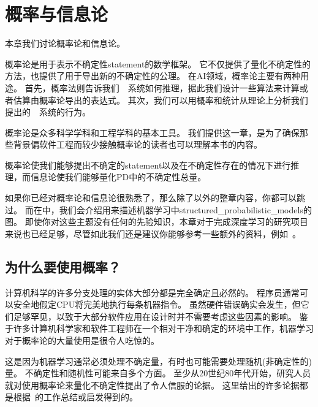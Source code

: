 \chapter{概率与信息论}
\label{chap:probability_and_information_theory}

本章我们讨论概率论和信息论。

概率论是用于表示不确定性\gls{statement}的数学框架。
它不仅提供了量化不确定性的方法，也提供了用于导出新的不确定性的公理。
在\gls{AI}领域，概率论主要有两种用途。
首先，概率法则告诉我们~~系统如何推理，据此我们设计一些算法来计算或者估算由概率论导出的表达式。
其次，我们可以用概率和统计从理论上分析我们提出的~~系统的行为。

概率论是众多科学学科和工程学科的基本工具。
我们提供这一章，是为了确保那些背景偏软件工程而较少接触概率论的读者也可以理解本书的内容。

概率论使我们能够提出不确定的\gls{statement}以及在不确定性存在的情况下进行推理，而信息论使我们能够量化\gls{PD}中的不确定性总量。

如果你已经对概率论和信息论很熟悉了，那么除了以外的整章内容，你都可以跳过。
而在中，我们会介绍用来描述机器学习中\gls{structured_probabilistic_models}的图。
即使你对这些主题没有任何的先验知识，本章对于完成深度学习的研究项目来说也已经足够，尽管如此我们还是建议你能够参考一些额外的资料，例如~\cite{Jaynes03}。


\section{为什么要使用概率？}
\label{sec:why_probability}

计算机科学的许多分支处理的实体大部分都是完全确定且必然的。
程序员通常可以安全地假定CPU将完美地执行每条机器指令。
虽然硬件错误确实会发生，但它们足够罕见，以致于大部分软件应用在设计时并不需要考虑这些因素的影响。
鉴于许多计算机科学家和软件工程师在一个相对干净和确定的环境中工作，机器学习对于概率论的大量使用是很令人吃惊的。

这是因为机器学习通常必须处理不确定量，有时也可能需要处理随机(非确定性的)量。
不确定性和随机性可能来自多个方面。
至少从20世纪80年代开始，研究人员就对使用概率论来量化不确定性提出了令人信服的论据。
这里给出的许多论据都是根据~\cite{Pearl88}的工作总结或启发得到的。

